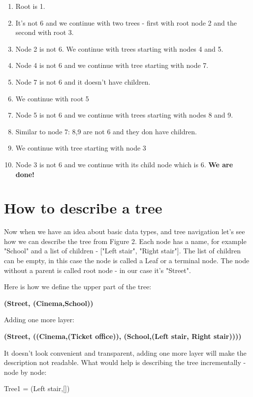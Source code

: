 \begin{leftborder}
\begin{enumerate}
\item Root is 1.
\item It's not 6 and we continue with two trees - first with root node 2
and the second with root 3.
\item Node 2 is not 6. We continue with trees starting with nodes 4 and 5.
\item Node 4 is not 6 and we continue with tree starting with node 7.
\item Node 7 is not 6 and it doesn't have children.
\item We continue with root 5
\item Node 5 is not 6 and we continue with trees starting
with nodes 8 and 9.
\item Similar to node 7: 8,9 are not 6 and they don have children.
\item We continue with tree starting with node 3
\item Node 3 is not 6 and we continue with its child node which is 6.
\textbf{We are done!}
\end{enumerate}
\end{leftborder}


\section{How to describe a tree}

Now when we have an idea about basic data types, and tree navigation
let's see how we can
describe the tree from Figure 2. Each node has a name, for example "School"
and a list of children - ["Left stair", "Right stair"]. The list of children can be empty, in this case the node is called a Leaf or a terminal node. The node without
a parent is called root node - in our case it's "Street".

Here is how we define
the upper part of the tree:

\medskip
\textbf{(Street, (Cinema,School))}
\medskip

Adding one more layer:

\medskip
\textbf{(Street, ((Cinema,(Ticket office)), (School,(Left stair, Right stair))))}
\medskip

It doesn't look convenient and transparent, adding one more layer
will make the description not readable. 
What would help is describing the tree incrementally - node by node:

Tree1 = (Left stair,[])

